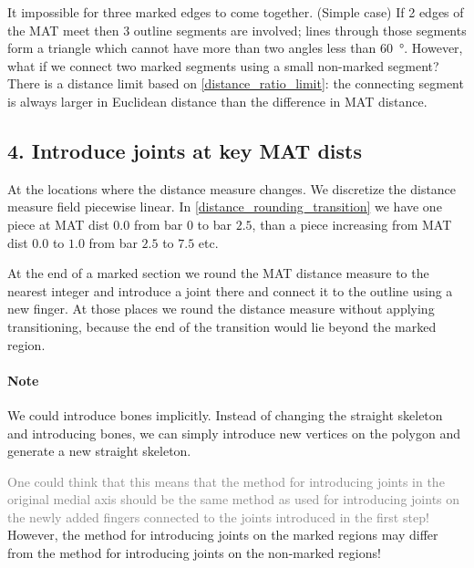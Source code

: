 It impossible for three marked edges to come together.
(Simple case) If 2 edges of the MAT meet then 3 outline segments are involved; lines through those segments form a triangle which cannot have more than two angles less than \SI{60}{\degree}.
However, what if we connect two marked segments using a small non-marked segment?
There is a distance limit based on \cref{distance_ratio_limit}:
the connecting segment is always larger in Euclidean distance than the difference in MAT distance.






\subsection{4. Introduce joints at key MAT dists}
At the locations where the distance measure changes.
We discretize the distance measure field piecewise linear.
In \cref{distance_rounding_transition} we have one piece at MAT dist $0.0$ from bar $0$ to bar $2.5$, than a piece increasing from MAT dist $0.0$ to $1.0$ from bar $2.5$ to $7.5$ etc.

At the end of a marked section we round the MAT distance measure to the nearest integer and introduce a joint there and connect it to the outline using a new finger.
At those places we round the distance measure without applying transitioning, because the end of the transition would lie beyond the marked region.
 
\paragraph{Note}
We could introduce bones implicitly.
Instead of changing the straight skeleton and introducing bones,
we can simply introduce new vertices on the polygon and generate a new straight skeleton.

\textcolor{gray}{
One could think that this means that the method for introducing joints in the original medial axis should be the same method as used for introducing joints on the newly added fingers connected to the joints introduced in the first step!
}
However, the method for introducing joints on the marked regions may differ from the method for introducing joints on the non-marked regions!










